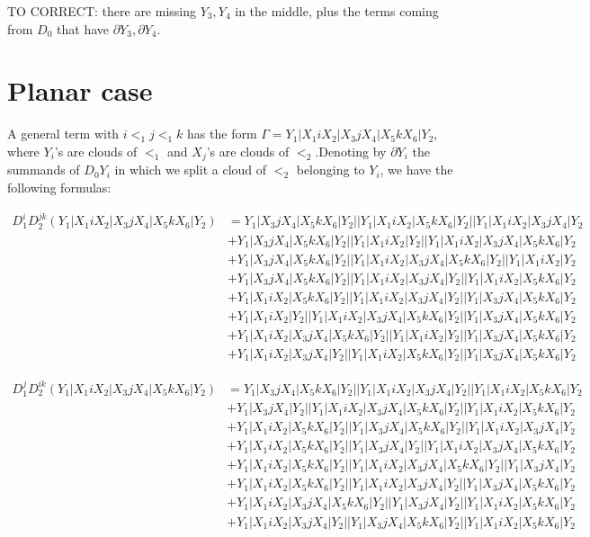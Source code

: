 \documentclass{article}[12pt]
\begin{document}
TO CORRECT: there are missing $Y_3, Y_4$ in the middle, plus the terms coming from $D_0$ that have $\partial Y_3, \partial Y_4$.
\section*{Planar case}
A general term with $i<_1 j <_1 k$ has the form $\Gamma = Y_1|X_1 iX_2| X_3 j X_4 |X_5 k X_6 | Y_2$, where $Y_i$'s are clouds of $<_1$ and $X_j$'s are clouds of $<_2$.Denoting by $\partial Y_i$ the summands of $D_0 Y_i$ in which we split a cloud of $<_2$ belonging to $Y_i$, we have the following formulas:

\begin{align*}
D_1^iD_2^{jk}(Y_1|X_1iX_2|X_3jX_4|X_5kX_6|Y_2)& =Y_1|X_3jX_4|X_5kX_6|Y_2||Y_1|X_1iX_2|X_5kX_6|Y_2||Y_1|X_1iX_2|X_3jX_4|Y_2\\ 
 & +Y_1|X_3jX_4|X_5kX_6|Y_2||Y_1|X_1iX_2|Y_2||Y_1|X_1iX_2|X_3jX_4|X_5kX_6|Y_2\\ 
 & +Y_1|X_3jX_4|X_5kX_6|Y_2||Y_1|X_1iX_2|X_3jX_4|X_5kX_6|Y_2||Y_1|X_1iX_2|Y_2\\ 
 & +Y_1|X_3jX_4|X_5kX_6|Y_2||Y_1|X_1iX_2|X_3jX_4|Y_2||Y_1|X_1iX_2|X_5kX_6|Y_2\\ 
 & +Y_1|X_1iX_2|X_5kX_6|Y_2||Y_1|X_1iX_2|X_3jX_4|Y_2||Y_1|X_3jX_4|X_5kX_6|Y_2\\ 
 & +Y_1|X_1iX_2|Y_2||Y_1|X_1iX_2|X_3jX_4|X_5kX_6|Y_2||Y_1|X_3jX_4|X_5kX_6|Y_2\\ 
 & +Y_1|X_1iX_2|X_3jX_4|X_5kX_6|Y_2||Y_1|X_1iX_2|Y_2||Y_1|X_3jX_4|X_5kX_6|Y_2\\ 
 & +Y_1|X_1iX_2|X_3jX_4|Y_2||Y_1|X_1iX_2|X_5kX_6|Y_2||Y_1|X_3jX_4|X_5kX_6|Y_2\end{align*}

\begin{align*}
D_1^jD_2^{ik}(Y_1|X_1iX_2|X_3jX_4|X_5kX_6|Y_2)& =Y_1|X_3jX_4|X_5kX_6|Y_2||Y_1|X_1iX_2|X_3jX_4|Y_2||Y_1|X_1iX_2|X_5kX_6|Y_2\\ 
 & +Y_1|X_3jX_4|Y_2||Y_1|X_1iX_2|X_3jX_4|X_5kX_6|Y_2||Y_1|X_1iX_2|X_5kX_6|Y_2\\ 
 & +Y_1|X_1iX_2|X_5kX_6|Y_2||Y_1|X_3jX_4|X_5kX_6|Y_2||Y_1|X_1iX_2|X_3jX_4|Y_2\\ 
 & +Y_1|X_1iX_2|X_5kX_6|Y_2||Y_1|X_3jX_4|Y_2||Y_1|X_1iX_2|X_3jX_4|X_5kX_6|Y_2\\ 
 & +Y_1|X_1iX_2|X_5kX_6|Y_2||Y_1|X_1iX_2|X_3jX_4|X_5kX_6|Y_2||Y_1|X_3jX_4|Y_2\\ 
 & +Y_1|X_1iX_2|X_5kX_6|Y_2||Y_1|X_1iX_2|X_3jX_4|Y_2||Y_1|X_3jX_4|X_5kX_6|Y_2\\ 
 & +Y_1|X_1iX_2|X_3jX_4|X_5kX_6|Y_2||Y_1|X_3jX_4|Y_2||Y_1|X_1iX_2|X_5kX_6|Y_2\\ 
 & +Y_1|X_1iX_2|X_3jX_4|Y_2||Y_1|X_3jX_4|X_5kX_6|Y_2||Y_1|X_1iX_2|X_5kX_6|Y_2\end{align*}
\end{document}

